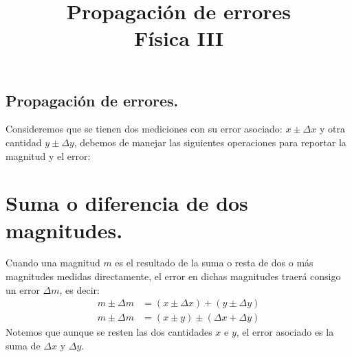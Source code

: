 \documentclass[14pt]{extarticle}
\title{\vspace*{-2cm} Propagación de errores \\  Física III \vspace{-5ex}}
\date{}
\begin{document}
\maketitle

\subsection{Propagación de errores.}

Consideremos que se tienen dos mediciones con su error asociado: $x \pm \Delta x$ y otra cantidad $y \pm \Delta y$, debemos de manejar las siguientes operaciones para reportar la magnitud y el error:

\section{Suma o diferencia de dos magnitudes.}

Cuando una magnitud $m$ es el resultado de la suma o resta de dos o más magnitudes medidas directamente, el error en dichas magnitudes traerá consigo un error $\Delta m$, es decir:
\begin{align*}
m \pm \Delta m &= (x \pm \Delta x) + (y \pm \Delta y) \\[0.5em]
m \pm \Delta m &= (x \pm y) \pm (\Delta x + \Delta y)
\end{align*}
Notemos que aunque se resten las dos cantidades $x$ e $y$, el error asociado es la suma de $\Delta x$ y $\Delta y$.
\end{document}
